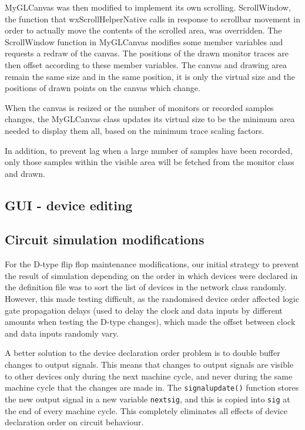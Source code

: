 \documentclass[a4paper,10pt]{article}
\begin{document}
MyGLCanvas was then modified to implement its own scrolling. ScrollWindow, the function that wxScrollHelperNative calls in response to scrollbar movement in order to actually move the contents of the scrolled area, was overridden. The ScrollWindow function in MyGLCanvas modifies some member variables and requests a redraw of the canvas. The positions of the drawn monitor traces are then offset according to these member variables. The canvas and drawing area remain the same size and in the same position, it is only the virtual size and the positions of drawn points on the canvas which change. 

When the canvas is resized or the number of monitors or recorded samples changes, the MyGLCanvas class updates its virtual size to be the minimum area needed to display them all, based on the minimum trace scaling factors.

In addition, to prevent lag when a large number of samples have been recorded, only those samples within the visible area will be fetched from the monitor class and drawn. 

\subsection{GUI - device editing}


\subsection{Circuit simulation modifications}
For the D-type flip flop maintenance modifications, our initial strategy to prevent the result of simulation depending on the order in which devices were declared in the definition file was to sort the list of devices in the network class randomly. However, this made testing difficult, as the randomised device order affected logic gate propagation delays (used to delay the clock and data inputs by different amounts when testing the D-type changes), which made the offset between clock and data inputs randomly vary. 

A better solution to the device declaration order problem is to double buffer changes to output signals. This means that changes to output signals are visible to other devices only during the next machine cycle, and never during the same machine cycle that the changes are made in. The \texttt{signalupdate()} function stores the new output signal in a new variable \texttt{nextsig}, and this is copied into \texttt{sig} at the end of every machine cycle. This completely eliminates all effects of device declaration order on circuit behaviour. 
\end{document}
